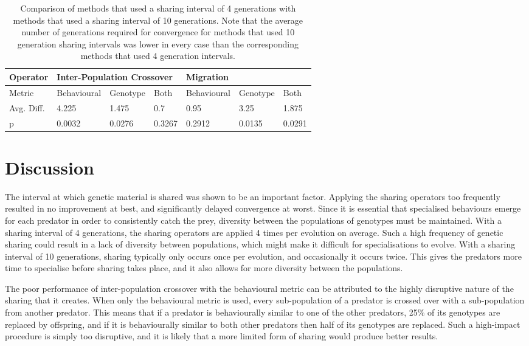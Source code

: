 \documentclass[12pt]{article} %
\begin{document}
\begin{table} \centering
    \begin{tabular}{|l|l|l|l|l|l|l|}
    \hline
    Operator	& \multicolumn{3}{l|}{Inter-Population Crossover} & \multicolumn{3}{l|}{Migration} \\ \hline
    Metric	& Behavioural	& Genotype	& Both	& Behavioural	& Genotype	& Both   \\ \hline
    Avg. Diff.	& 4.225		& 1.475	& 0.7		& 0.95		& 3.25	& 1.875  \\ \hline
    p 		& 0.0032		& 0.0276	& 0.3267	& 0.2912		& 0.0135	& 0.0291 \\ \hline
    \end{tabular}
   \caption{Comparison of methods that used a sharing interval of 4 generations with methods that used a sharing interval of 10 generations. Note that the average number of generations required for convergence for methods that used 10 generation sharing intervals was lower in every case than the corresponding methods that used 4 generation intervals.}
\end{table}

\section{Discussion}

The interval at which genetic material is shared was shown to be an important factor. Applying the sharing operators too frequently resulted in no improvement at best, and significantly delayed convergence at worst. Since it is essential that specialised behaviours emerge for each predator in order to consistently catch the prey, diversity between the populations of genotypes must be maintained. With a sharing interval of 4 generations, the sharing operators are applied 4 times per evolution on average. Such a high frequency of genetic sharing could result in a lack of diversity between populations, which might make it difficult for specialisations to evolve. With a sharing interval of 10 generations, sharing typically only occurs once per evolution, and occasionally it occurs twice. This gives the predators more time to specialise before sharing takes place, and it also allows for more diversity between the populations.

The poor performance of inter-population crossover with the behavioural metric can be attributed to the highly disruptive nature of the sharing that it creates. When only the behavioural metric is used, every sub-population of a predator is crossed over with a sub-population from another predator. This means that if a predator is behaviourally similar to one of the other predators, 25\% of its genotypes are replaced by offspring, and if it is behaviourally similar to both other predators then half of its genotypes are replaced. Such a high-impact procedure is simply too disruptive, and it is likely that a more limited form of sharing would produce better results.
\end{document}
